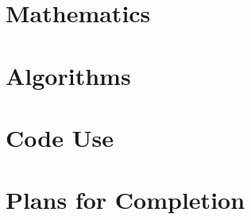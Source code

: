 \documentclass[10pt]{article}
\begin{document}
\section{Mathematics}

\lipsum[2] 







\section{Algorithms}

\lipsum[3] 







\section{Code Use}

\lipsum[4] 







\section{Plans for Completion}

\lipsum[5] 








\end{document}
